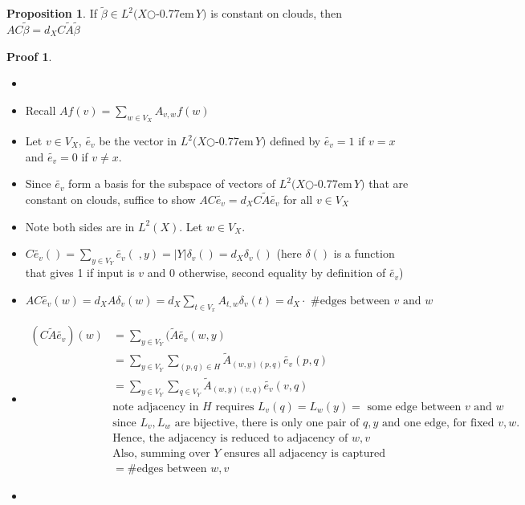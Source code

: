 \documentclass{book}
\newcommand{\zigzag}{$\bigcirc$\kern-0.77em\raisebox{-.16ex}{\small Z}$\,$}
\newcommand{\abs}[1]{\lvert #1 \rvert }
\theoremstyle{definition}
\newtheorem{proposition}[lemma]{Proposition}
\theoremstyle{remarkstyle}
\newtheorem*{myproof}{Proof}%
\begin{document}
\begin{proposition}
    If $\tilde{\beta}\in L^{2}(X$\zigzag$Y)$ is constant on clouds, then $AC\tilde{\beta}=d_XC\tilde{A}\tilde{\beta}$
\end{proposition}
\begin{myproof}
    \begin{itemize}
        \item[]
        \item Recall $Af(v) = \sum_{w\in V_X}A_{v,w}f(w) $
        \item Let $v\in V_X$, $\tilde{e_v}$ be the vector in $L^{2}(X$\zigzag$Y)$ defined by $\tilde{e_v} = 1$ if $v=x$ and $\tilde{e_v} = 0$ if $v\neq x$. 
        \item Since $\tilde{e_v}$ form a basis for the subspace of vectors of $L^{2}(X$\zigzag$Y)$ that are constant on clouds, suffice to show $AC\tilde{e_v}=d_XC\tilde{A}\tilde{e_v}$ for all $v\in V_X$
        \item Note both sides are in $L^{2}(X)$. Let $w\in V_X$.
        \item $C\tilde{e_v}()=\sum_{y\in V_Y}\tilde{e_v}(\;,y)=\abs{Y}\delta_v()=d_X\delta_v() $ (here $\delta()$ is a function that gives 1 if input is $v$ and 0 otherwise, second equality by definition of $\tilde{e_v}$)
        \item $AC\tilde{e_v}(w)=d_XA\delta_v(w)=d_X\sum_{t\in V_x}A_{t,w}\delta_v(t)=d_X \cdot \textrm{ \#edges between $v$ and $w$} $
        \item 
        \begin{align*}
            (C\tilde{A}\tilde{e_v})(w) 
            &=\sum_{y\in V_Y}(\tilde{A}\tilde{e_v}(w,y) \\
            &=\sum_{y\in V_Y}\sum_{(p,q)\in H}\tilde{A}_{(w,y)(p,q)}\tilde{e_v}(p,q) \\
            &=\sum_{y\in V_Y}\sum_{q\in V_Y}\tilde{A}_{(w,y)(v,q)}\tilde{e_v}(v,q) \\
            &\textrm{note adjacency in $H$ requires $L_v(q)=L_w(y)=$ some edge between $v$ and $w$ }\\
            &\textrm{since $L_v,L_w$ are bijective, there is only one pair of $q, y$ and one edge, for fixed $v,w$.}\\
            &\textrm{Hence, the adjacency is reduced to adjacency of $w,v$}\\
            &\textrm{Also, summing over $Y$ ensures all adjacency is captured}\\
            &= \textrm{\# edges between $w,v$}
        \end{align*}
        \item[] 
    \end{itemize}
\end{myproof}
\end{document}
